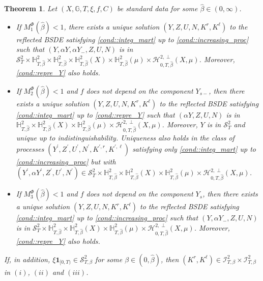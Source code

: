 \documentclass[10pt]{article} %
\newtheorem{theorem}{Theorem}[section]
\newcommand\cH{\mathcal H}
\newcommand\cI{\mathcal I}
\newcommand\cS{\mathcal S}
\def \G{\mathbb{G}}
\def \H{\mathbb{H}}
\begin{document}
\begin{theorem}\label{thm::main}
	Let $(X,\G,T,\xi,f,C)$ be standard data for some $\hat\beta \in (0,\infty)$.
	
	\begin{itemize}
	\item[$(i)$] If $M_1^\Phi(\hat\beta) < 1$, there exists a unique solution $(Y,Z,U,N,K^r,K^\ell)$ to the reflected {\rm BSDE} satisfying \ref{cond::integ_mart} up to \ref{cond::increasing_proc} such that $(Y,\alpha Y,\alpha Y_-,Z,U,N)$ is in $\cS^2_T \times \H^2_{T,\hat\beta} \times \H^2_{T,\hat\beta} \times \H^2_{T,\hat\beta}(X) \times \H^2_{T,\hat\beta}(\mu) \times \cH^{2,\perp}_{0,T,\hat\beta}(X,\mu)$. Moreover, \ref{cond::repre_Y} also holds. %
	
	
	\item[$(ii)$] If $M_2^\Phi(\hat\beta) < 1$ and $f$ does not depend on the component $Y_{s-}$, then there exists a unique solution $(Y,Z,U,N,K^r,K^\ell)$ to the reflected {\rm BSDE} satisfying \ref{cond::integ_mart} up to \ref{cond::repre_Y} such that $(\alpha Y,Z,U,N)$ is in $\H^2_{T,\hat\beta} \times \H^2_{T,\hat\beta}(X) \times \H^2_{T,\hat\beta}(\mu) \times \cH^{2,\perp}_{0,T,\hat\beta}(X,\mu)$. Moreover, $Y$ is in $\cS^2_T$ and unique up to indistinguishability. Uniqueness also holds in the class of processes $(Y^\prime, Z^\prime, U^\prime, N^\prime, K^{\prime,r}, K^{\prime,\ell})$ satisfying only \ref{cond::integ_mart} up to \ref{cond::increasing_proc} but with $( Y^\prime, \alpha Y^\prime, Z^\prime, U^\prime, N^\prime) \in \cS^2_T \times \H^2_{T,\hat\beta} \times \H^2_{T,\hat\beta}(X) \times \H^2_{T,\hat\beta}(\mu) \times \cH^{2,\perp}_{0,T,\hat\beta}(X,\mu)$. %
	
	
	\item[$(iii)$] If $M_3^\Phi(\hat\beta) < 1$ and $f$ does not depend on the component $Y_s$, then there exists a unique solution $(Y,Z,U,N,K^r,K^\ell)$ to the reflected {\rm BSDE} satisfying \ref{cond::integ_mart} up to \ref{cond::increasing_proc} such that $(Y,\alpha Y_-,Z,U,N)$ is in $\cS^2_T \times \H^2_{T,\hat\beta} \times \H^2_{T,\hat\beta}(X) \times \H^2_{T,\hat\beta}(\mu) \times \cH^{2,\perp}_{0,T,\hat\beta}(X,\mu)$. Moreover, \ref{cond::repre_Y} also holds. 
	\end{itemize}
	If, in addition, $\xi\mathbf{1}_{[0,T)} \in \cS^2_{T,\beta}$ for some $\beta \in (0,\hat\beta)$, then $(K^r,K^\ell) \in \cI^2_{T,\beta} \times \cI^2_{T,\beta}$ in $(i)$, $(ii)$ and $(iii)$.
\end{theorem}
\end{document}
